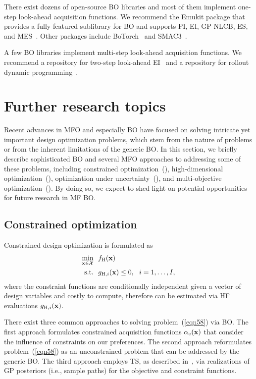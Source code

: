 \documentclass[journal ]{new-aiaa}
\begin{document}
	There exist dozens of open-source BO libraries and most of them implement one-step look-ahead acquisition functions.
	We recommend the Emukit package that provides a fully-featured sublibrary for BO and supports PI, EI, GP-NLCB, ES, and MES~\citep{Paleyes2019}.
	Other packages include BoTorch~\citep{Balandat2020} and SMAC3~\citep{Lindauer2022}.
	
	A few BO libraries implement multi-step look-ahead acquisition functions. 
	We recommend a repository for two-step look-ahead EI~\citep{WuJ2019} and a repository for rollout dynamic programming~\citep{Lee2020}.
	
	\section{Further research topics}\label{Sec6}
	
	Recent advances in MFO and especially BO have focused on solving intricate yet important design optimization problems, which stem from the nature of problems or from the inherent limitations of the generic BO.  
	In this section, we briefly describe sophisticated BO and several MFO approaches to addressing some of these problems, including constrained optimization~(), high-dimensional optimization~(), optimization under uncertainty~(), and multi-objective optimization~().
	By doing so, we expect to shed light on potential opportunities for future research in MF BO.
	
	\subsection{Constrained optimization}\label{Sec61}
	
	Constrained design optimization is formulated as
	\begin{equation}\label{eqn58}
		\begin{aligned}
			\underset{{\bf x} \in \mathcal{X}}{\min} \ \ & f_\text{H}(\bf x)\\
			\textrm{s.t.} \ \ 
			& g_{\text{H},i}({\bf x}) \leq 0,\ \ i=1,\dots,I, 
		\end{aligned}
	\end{equation}
	where the constraint functions are conditionally independent given a vector of design variables and costly to compute, therefore can be estimated via HF evaluations $g_{\text{H},i}({\bf x})$.
	
	There exist three common approaches to solving problem~(\ref{eqn58}) via BO.
	The first approach formulates constrained acquisition functions $\alpha_\text{c}({\bf x})$ that consider the influence of constraints on our preferences.
	The second approach reformulates problem~(\ref{eqn58}) as an unconstrained problem that can be addressed by the generic BO.
	The third approach employs TS, as described in~\Cref{Algo2}, via realizations of GP posteriors (i.e., sample paths) for the objective and constraint functions.    
	
\end{document}

